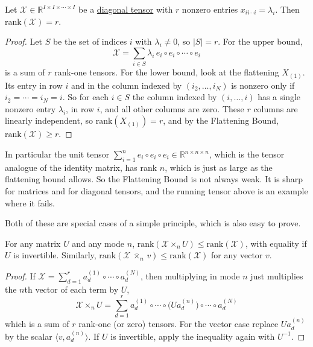     \begin{lemma}
      \label{lem:diagonal-rank}
      Let $\mathcal{X} \in \mathbb{R}^{I \times I \times \cdots \times I}$ be a \hyperref[def:diagonal-tensor]{diagonal tensor} with $r$ nonzero entries $x_{i i \cdots i} = \lambda_i$. Then $\mathrm{rank}(\mathcal{X}) = r$. 
    \end{lemma}
    \begin{proof}
      Let $S$ be the set of indices $i$ with $\lambda_i \neq 0$, so $|S| = r$. For the upper bound, 
      \begin{equation}
        \mathcal{X} = \sum_{i \in S} \lambda_i \, e_i \circ e_i \circ \cdots \circ e_i
      \end{equation}
      is a sum of $r$ rank-one tensors. For the lower bound, look at the flattening $X_{(1)}$. Its entry in row $i$ and in the column indexed by $(i_2, \ldots, i_N)$ is nonzero only if $i_2 = \cdots = i_N = i$. So for each $i \in S$ the column indexed by $(i, \ldots, i)$ has a single nonzero entry $\lambda_i$, in row $i$, and all other columns are zero. These $r$ columns are linearly independent, so $\mathrm{rank}(X_{(1)}) = r$, and by the Flattening Bound, $\mathrm{rank}(\mathcal{X}) \geq r$. 
    \end{proof}

    In particular the unit tensor $\sum_{i=1}^n e_i \circ e_i \circ e_i \in \mathbb{R}^{n \times n \times n}$, which is the tensor analogue of the identity matrix, has rank $n$, which is just as large as the flattening bound allows. So the Flattening Bound is not always weak. It is sharp for matrices and for diagonal tensors, and the running tensor above is an example where it fails. 

    Both of these are special cases of a simple principle, which is also easy to prove. 

    \begin{lemma}
      \label{lem:contraction}
      For any matrix $U$ and any mode $n$, $\mathrm{rank}(\mathcal{X} \times_n U) \leq \mathrm{rank}(\mathcal{X})$, with equality if $U$ is invertible. Similarly, $\mathrm{rank}(\mathcal{X} \,\bar{\times}_n\, v) \leq \mathrm{rank}(\mathcal{X})$ for any vector $v$. 
    \end{lemma}
    \begin{proof}
      If $\mathcal{X} = \sum_{d=1}^r a_d^{(1)} \circ \cdots \circ a_d^{(N)}$, then multiplying in mode $n$ just multiplies the $n$th vector of each term by $U$, 
      \begin{equation}
        \mathcal{X} \times_n U = \sum_{d=1}^r a_d^{(1)} \circ \cdots \circ \big( U a_d^{(n)} \big) \circ \cdots \circ a_d^{(N)}
      \end{equation}
      which is a sum of $r$ rank-one (or zero) tensors. For the vector case replace $U a_d^{(n)}$ by the scalar $\langle v, a_d^{(n)} \rangle$. If $U$ is invertible, apply the inequality again with $U^{-1}$. 
    \end{proof}

